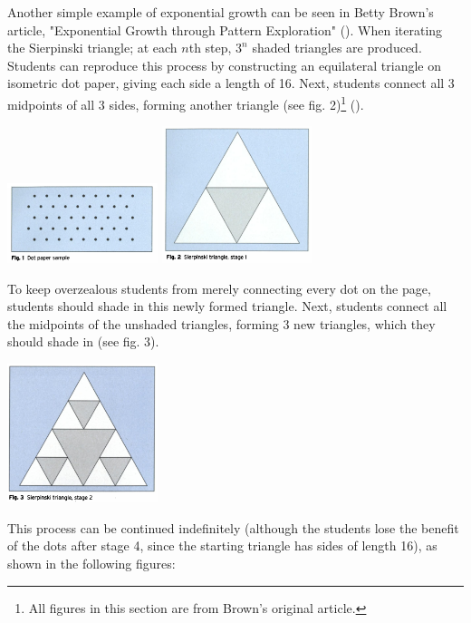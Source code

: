 \documentclass[man, 12pt]{apa6}
\newcommand{\citep}[1]{(\cite{#1})}
\begin{document}
Another simple example of exponential growth can be seen in 
Betty Brown's article, "Exponential Growth through Pattern Exploration" \citep{brown_2005}. When iterating the Sierpinski triangle; at each $n$th step, $3^n$ shaded triangles are produced. Students can reproduce this process by constructing an equilateral triangle on isometric dot paper, giving each side a length of 16. Next, students connect all 3 midpoints of all 3 sides, forming another triangle (see fig. 2)\footnote{All figures in this section are from Brown's original article.} \citep{brown_2005}. 
\begin{center}
\includegraphics[width=0.33\textwidth]{sierp_fig_1}
\includegraphics[width=0.33\textwidth]{sierp_fig_2}
\end{center}
To keep overzealous students from merely connecting every dot on the page, students should shade in this newly formed triangle. Next, students connect all the midpoints of the unshaded triangles, forming 3 new triangles, which they should shade in (see fig. 3).
\begin{center}
\includegraphics[width=0.33\textwidth]{sierp_fig_3}
\end{center}
This process can be continued indefinitely (although the students lose the benefit of the dots after stage 4, since the starting triangle has sides of length 16), as shown in the following figures:
\end{document}

